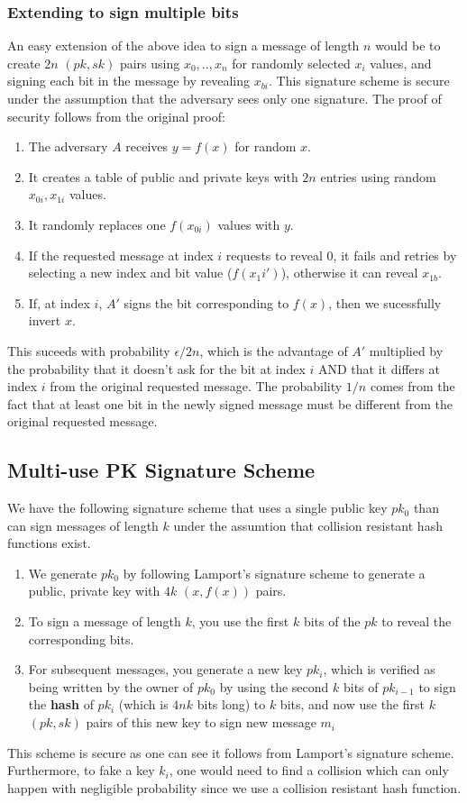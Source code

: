 \documentclass[11pt]{article}
\begin{document}
\subsubsection{Extending to sign multiple bits}
An easy extension of the above idea to sign a message of length $n$ would be to create $2n$ $(pk,sk)$ pairs using $x_0,..,x_n$ for randomly selected $x_i$ values, and signing each bit in the message by revealing $x_{bi}$. This signature scheme is secure under the assumption that the adversary sees only one signature. The proof of security follows from the original proof:
\begin{enumerate}
    \item The adversary $A$ receives $y=f(x)$ for random $x$.
    \item It creates a table of public and private keys with $2n$ entries using random $x_{0i}, x_{1i}$ values.
    \item It randomly replaces one $f(x_{0i})$ values with $y$.
    \item If the requested message at index $i$ requests to reveal $0$, it fails and retries by selecting a new index and bit value ($f(x_1i')$), otherwise it can reveal $x_{1b}$.
    \item If, at index $i$, $A'$ signs the bit corresponding to $f(x)$, then we sucessfully invert $x$.
\end{enumerate}
This suceeds with probability $\epsilon/2n$, which is the advantage of $A'$ multiplied by the probability that it doesn't ask for the bit at index $i$ AND that it differs at index $i$ from the original requested message. The probability $1/n$ comes from the fact that at least one bit in the newly signed message must be different from the original requested message.

\subsection{Multi-use PK Signature Scheme}
We have the following signature scheme that uses a single public key $pk_0$ than can sign messages of length $k$ under the assumtion that collision resistant hash functions exist.
\begin{enumerate}
    \item We generate $pk_0$ by following Lamport's signature scheme to generate a public, private key with $4k$ $(x,f(x))$ pairs.
    \item To sign a message of length $k$, you use the first $k$ bits of the $pk$ to reveal the corresponding bits.
    \item For subsequent messages, you generate a new key $pk_i$, which is verified as being written by the owner of $pk_0$ by using the second $k$ bits of $pk_{i-1}$ to sign the \textbf{hash} of $pk_i$ (which is $4nk$ bits long) to $k$ bits, and now use the first $k$ $(pk,sk)$ pairs of this new key to sign new message $m_i$
\end{enumerate}
This scheme is secure as one can see it follows from Lamport's signature scheme. Furthermore, to fake a key $k_i$, one would need to find a collision which can only happen with negligible probability since we use a collision resistant hash function.
\end{document}
